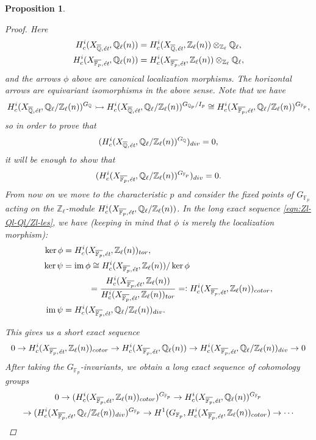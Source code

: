 \documentclass{article}
\DeclareMathOperator{\im}{im}
\newcommand{\FF}{\mathbb{F}}
\newcommand{\QQ}{\mathbb{Q}}
\newcommand{\ZZ}{\mathbb{Z}}
\newcommand{\rdfn}{=\mathrel{\mathop:}}
\newtheorem{proposition}[theorem]{Proposition}
\theoremstyle{definition}
\numberwithin{equation}{section}
\begin{document}
\begin{proposition}
\begin{proof}
    Here
    \begin{align*}
      H_c^i (X_{\overline{\QQ},\text{\it ét}}, \QQ_\ell (n)) & = H_c^i (X_{\overline{\QQ},\text{\it ét}}, \ZZ_\ell (n))\otimes_{\ZZ_\ell} \QQ_\ell,\\
      H_c^i (X_{\overline{\FF_p},\text{\it ét}}, \QQ_\ell (n)) & = H_c^i (X_{\overline{\FF_p},\text{\it ét}}, \ZZ_\ell (n))\otimes_{\ZZ_\ell} \QQ_\ell,
    \end{align*}
    and the arrows $\phi$ above are canonical localization morphisms.
    The horizontal arrows are equivariant isomorphisms in the above sense. Note
    that we have
    \[ H^i_c (X_{\overline{\QQ}, \text{\it ét}}, \QQ_\ell/\ZZ_\ell (n))^{G_\QQ} \rightarrowtail
    H^i_c (X_{\overline{\QQ}, \text{\it ét}}, \QQ_\ell/\ZZ_\ell (n))^{G_{\QQ_p}/I_p}
    \cong H^i_c (X_{\overline{\FF_p}, \text{\it ét}}, \QQ_\ell/\ZZ_\ell (n))^{G_{\FF_p}}, \]
    so in order to prove that
    $$(H^i_c (X_{\overline{\QQ},\text{\it ét}}, \QQ_\ell/\ZZ_\ell (n))^{G_\QQ})_{div} = 0,$$
    it will be enough to show that
    $$(H^i_c (X_{\overline{\FF_p},\text{\it ét}}, \QQ_\ell/\ZZ_\ell (n))^{G_{\FF_p}})_{div} = 0.$$
    From now on we move to the characteristic $p$ and consider the fixed points
    of $G_{\FF_p}$ acting on the $\ZZ_\ell$-module
    $H^i_c (X_{\overline{\FF_p},\text{\it ét}}, \QQ_\ell/\ZZ_\ell (n))$.
    In the long exact sequence \eqref{eqn:Zl-Ql-Ql/Zl-les}, we have (keeping in
    mind that $\phi$ is merely the localization morphism):
    \begin{align*}
      \ker \phi & = H^i_c (X_{\overline{\FF_p},\text{\it ét}}, \ZZ_\ell (n))_{tor},\\
      \ker \psi & = \im \phi \cong H^i_c (X_{\overline{\FF_p},\text{\it ét}}, \ZZ_\ell (n)) / \ker \phi \\
      & \quad\quad\quad = \frac{H^i_c (X_{\overline{\FF_p},\text{\it ét}}, \ZZ_\ell (n))}{H^i_c (X_{\overline{\FF_p},\text{\it ét}}, \ZZ_\ell (n))_{tor}} \rdfn H^i_c (X_{\overline{\FF_p},\text{\it ét}}, \ZZ_\ell (n))_{cotor},\\
      \im \psi & = H_c^i (X_{\overline{\FF_p},\text{\it ét}}, \QQ_\ell/\ZZ_\ell (n))_{div}.
    \end{align*}

    This gives us a short exact sequence
    \[ 0 \to H^i_c (X_{\overline{\FF_p},\text{\it ét}}, \ZZ_\ell (n))_{cotor} \to
    H^i_c (X_{\overline{\FF_p},\text{\it ét}}, \QQ_\ell (n)) \to
    H^i_c (X_{\overline{\FF_p},\text{\it ét}}, \QQ_\ell/\ZZ_\ell (n))_{div} \to 0 \]
    After taking the $G_{\FF_p}$-invariants, we obtain a long exact sequence
    of cohomology groups
    \begin{multline}
      \label{eqn:cohomology-long-exact-sequence-with-GFp}
      0 \to (H^i_c (X_{\overline{\FF_p},\text{\it ét}}, \ZZ_\ell (n))_{cotor})^{G_{\FF_p}} \to
      H^i_c (X_{\overline{\FF_p},\text{\it ét}}, \QQ_\ell (n))^{G_{\FF_p}} \\
      \to (H^i_c (X_{\overline{\FF_p},\text{\it ét}}, \QQ_\ell/\ZZ_\ell (n))_{div})^{G_{\FF_p}} \to
      H^1 (G_{\FF_p}, H^i_c (X_{\overline{\FF_p},\text{\it ét}}, \ZZ_\ell (n))_{cotor}) \to \cdots
    \end{multline}


\end{proof}
\end{proposition}
\end{document}
